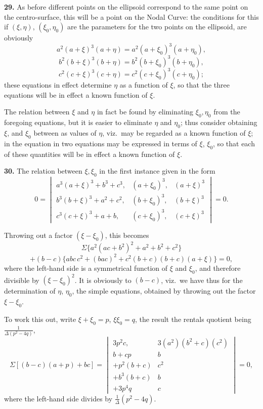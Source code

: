 \documentclass[11pt,a4paper]{article}
\theoremstyle{plain}
\theoremstyle{definition}
\begin{document}
\textbf{29.} As before different points on the ellipsoid correspond to the same point on the centro-surface, this will be a point on the Nodal Curve: the conditions for this if $(\xi,\eta)$, $(\xi_0, \eta_0)$ are the parameters for the two points on the ellipsoid, are obviously
\[
a^2(a + \xi)^3(a + \eta) = a^2(a + \xi_0)^3(a + \eta_0),
\]
\[
b^2(b + \xi)^3(b + \eta) = b^2(b + \xi_0)^3(b + \eta_0),
\]
\[
c^2(c + \xi)^3(c + \eta) = c^2(c + \xi_0)^3(c + \eta_0);
\]
these equations in effect determine $\eta$ as a function of $\xi$, so that the three equations will be in effect a known function of $\xi$.

The relation between $\xi$ and $\eta$ in fact be found by eliminating $\xi_0, \eta_0$ from the foregoing equations, but it is easier to eliminate $\eta$ and $\eta_0$; thus consider obtaining $\xi$, and $\xi_0$ between as values of $\eta$, viz.\ may be regarded as a known function of $\xi$; in the equation in two equations may be expressed in terms of $\xi$, $\xi_0$, so that each of these quantities will be in effect a known function of $\xi$.

\textbf{30.} The relation between $\xi, \xi_0$ in the first instance given in the form
\[
0 = \begin{vmatrix} a^3(a + \xi)^3 + b^3 + c^3, & (a + \xi_0)^3, & (a + \xi)^3 \\
b^3(b + \xi)^3 + a^2 + c^2, & (b + \xi_0)^3, & (b + \xi)^3 \\
c^3(c + \xi)^3 + a + b, & (c + \xi_0)^3, & (c + \xi)^3 \end{vmatrix} = 0.
\]

Throwing out a factor $(\xi - \xi_0)$, this becomes
\[
\Sigma\{a^2(a c + b^2)^2 + a^2 + b^2 + c^2\}
\]
\[
+ (b - c)\{abc \, c^2 + (b a c)^2 + c^2(b + c)(b + c)(a + \xi)\} = 0,
\]
where the left-hand side is a symmetrical function of $\xi$ and $\xi_0$, and therefore divisible by $(\xi - \xi_0)^2$. It is obviously to $(b - c)$, viz.\ we have thus for the determination of $\eta$, $\eta_0$, the simple equations, obtained by throwing out the factor $\xi - \xi_0$.

To work this out, write $\xi + \xi_0 = p$, $\xi\xi_0 = q$, the result the rentals quotient being $\frac{1}{\Delta(p^2 - 4q)}$,
\[
\Sigma[(b - c)(a + p) + bc] = \begin{vmatrix} 3p^2 c, & 3 (a^2)(b^2 + c)(c^2)\\
b + cp & b\\
+ p^2(b + c) & c^2\\
+ b^3(b + c) & b\\
+ 3p^4 q & c \end{vmatrix} = 0,
\]
where the left-hand side divides by $\tfrac{1}{\Delta}(p^2 - 4q)$.
\end{document}
